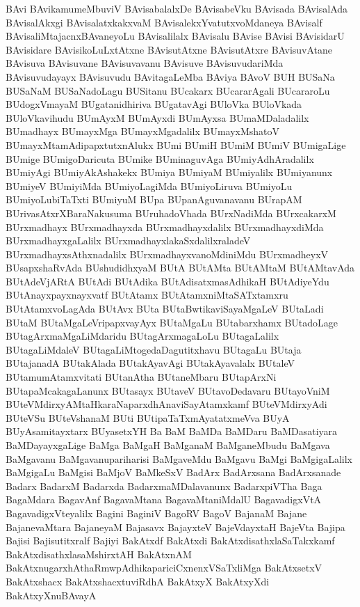 {BAvi
BAvikamumeMbuviV
BAvisabalalxDe
BAvisabeVku
BAvisada
BAvisalAda
BAvisalAkxgi
BAvisalatxkakxvaM
BAvisalekxYvatutxvoMdaneya
BAvisalf
BAvisaliMtajacnxBAvaneyoLu
BAvisalilalx
BAvisalu
BAvise
BAvisi
BAvisidarU
BAvisidare
BAvisikoLuLxtAtxne
BAvisutAtxne
BAvisutAtxre
BAvisuvAtane
BAvisuva
BAvisuvane
BAvisuvavanu
BAvisuve
BAvisuvudariMda
BAvisuvudayayx
BAvisuvudu
BAvitagaLeMba
BAviya
BAvoV
BUH
BUSaNa
BUSaNaM
BUSaNadoLagu
BUSitanu
BUcakarx
BUcararAgali
BUcararoLu
BUdogxVmayaM
BUgatanidhiriva
BUgatavAgi
BUloVka
BUloVkada
BUloVkavihudu
BUmAyxM
BUmAyxdi
BUmAyxsa
BUmaMDaladalilx
BUmadhayx
BUmayxMga
BUmayxMgadalilx
BUmayxMshatoV
BUmayxMtamAdipapxtutxnAlukx
BUmi
BUmiH
BUmiM
BUmiV
BUmigaLige
BUmige
BUmigoDaricuta
BUmike
BUminaguvAga
BUmiyAdhAradalilx
BUmiyAgi
BUmiyAkAshakekx
BUmiya
BUmiyaM
BUmiyalilx
BUmiyanunx
BUmiyeV
BUmiyiMda
BUmiyoLagiMda
BUmiyoLiruva
BUmiyoLu
BUmiyoLubiTaTxti
BUmiyuM
BUpa
BUpanAguvanavanu
BUrapAM
BUrivasAtxrXBaraNakusuma
BUruhadoVhada
BUrxNadiMda
BUrxcakarxM
BUrxmadhayx
BUrxmadhayxda
BUrxmadhayxdalilx
BUrxmadhayxdiMda
BUrxmadhayxgaLalilx
BUrxmadhayxlakaSxdalilxraladeV
BUrxmadhayxsAthxnadalilx
BUrxmadhayxvanoMdiniMdu
BUrxmadheyxV
BUsapxshaRvAda
BUshudidhxyaM
BUtA
BUtAMta
BUtAMtaM
BUtAMtavAda
BUtAdeVjARtA
BUtAdi
BUtAdika
BUtAdisatxmasAdhikaH
BUtAdiyeYdu
BUtAnayxpayxnayxvatf
BUtAtamx
BUtAtamxniMtaSATxtamxru
BUtAtamxvoLagAda
BUtAvx
BUta
BUtaBwtikaviSayaMgaLeV
BUtaLadi
BUtaM
BUtaMgaLeVripapxvayAyx
BUtaMgaLu
BUtabarxhamx
BUtadoLage
BUtagArxmaMgaLiMdaridu
BUtagArxmagaLoLu
BUtagaLalilx
BUtagaLiMdaleV
BUtagaLiMtogedaDagutitxhavu
BUtagaLu
BUtaja
BUtajanadA
BUtakAlada
BUtakAyavAgi
BUtakAyavalalx
BUtaleV
BUtamumAtamxvitati
BUtanAtha
BUtaneMbaru
BUtapArxNi
BUtapaMcakagaLanunx
BUtasayx
BUtaveV
BUtavoDedavaru
BUtayoVniM
BUteVMdirxyAMtaHkaraNaparxdhAnaviSayAtamxkamf
BUteVMdirxyAdi
BUteVSu
BUteVshanaM
BUti
BUtipaTaTxmAyatatxmeVva
BUyA
BUyAsamitayxtarx
BUyasetxYH
Ba
BaM
BaMDa
BaMDaru
BaMDasatiyara
BaMDayayxgaLige
BaMga
BaMgaH
BaMganaM
BaMganeMbudu
BaMgava
BaMgavanu
BaMgavanupariharisi
BaMgaveMdu
BaMgavu
BaMgi
BaMgigaLalilx
BaMgigaLu
BaMgisi
BaMjoV
BaMkeSxV
BadArx
BadArxsana
BadArxsanade
Badarx
BadarxM
Badarxda
BadarxmaMDalavanunx
BadarxpiVTha
Baga
BagaMdara
BagavAnf
BagavaMtana
BagavaMtaniMdalU
BagavadigxVtA
BagavadigxVteyalilx
Bagini
BaginiV
BagoRV
BagoV
BajanaM
Bajane
BajanevaMtara
BajaneyaM
Bajasavx
BajayxteV
BajeVdayxtaH
BajeVta
Bajipa
Bajisi
Bajisutitxralf
Bajiyi
BakAtxdf
BakAtxdi
BakAtxdisathxlaSaTakxkamf
BakAtxdisathxlasaMshirxtAH
BakAtxnAM
BakAtxnugarxhAthaRmwpAdhikapariciCxnenxVSaTxliMga
BakAtxsetxV
BakAtxshacx
BakAtxshacxtuviRdhA
BakAtxyX
BakAtxyXdi
BakAtxyXnuBAvayA
}
